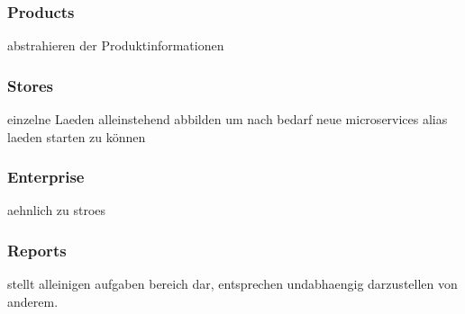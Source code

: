 		\subsubsection{Products}
		abstrahieren der Produktinformationen 
		
		\subsubsection{Stores}
		einzelne Laeden alleinstehend abbilden um nach bedarf neue microservices alias laeden starten zu können
		
		\subsubsection{Enterprise}
		aehnlich zu stroes
		
		\subsubsection{Reports}
		stellt alleinigen aufgaben bereich dar, entsprechen undabhaengig darzustellen von anderem.

